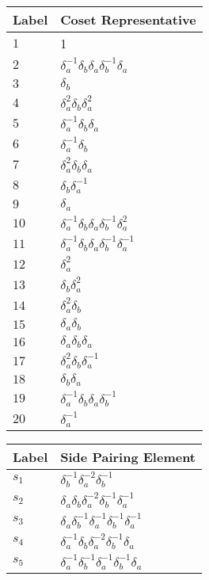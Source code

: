 \documentclass{article}
\begin{document}
\begin{center}
\begin{tabular}{ll}
\toprule
Label & Coset Representative\\
\midrule
$1$ & 1 \\
$2$ & $\delta_a^{-1}\delta_b^{}\delta_a^{}\delta_b^{-1}\delta_a^{}$ \\
$3$ & $\delta_b^{}$ \\
$4$ & $\delta_a^{2}\delta_b^{}\delta_a^{2}$ \\
$5$ & $\delta_a^{-1}\delta_b^{}\delta_a^{}$ \\
$6$ & $\delta_a^{-1}\delta_b^{}$ \\
$7$ & $\delta_a^{2}\delta_b^{}\delta_a^{}$ \\
$8$ & $\delta_b^{}\delta_a^{-1}$ \\
$9$ & $\delta_a^{}$ \\
$10$ & $\delta_a^{-1}\delta_b^{}\delta_a^{}\delta_b^{-1}\delta_a^{2}$ \\
$11$ & $\delta_a^{-1}\delta_b^{}\delta_a^{}\delta_b^{-1}\delta_a^{-1}$ \\
$12$ & $\delta_a^{2}$ \\
$13$ & $\delta_b^{}\delta_a^{2}$ \\
$14$ & $\delta_a^{2}\delta_b^{}$ \\
$15$ & $\delta_a^{}\delta_b^{}$ \\
$16$ & $\delta_a^{}\delta_b^{}\delta_a^{}$ \\
$17$ & $\delta_a^{2}\delta_b^{}\delta_a^{-1}$ \\
$18$ & $\delta_b^{}\delta_a^{}$ \\
$19$ & $\delta_a^{-1}\delta_b^{}\delta_a^{}\delta_b^{-1}$ \\
$20$ & $\delta_a^{-1}$ \\
\bottomrule
\end{tabular}
\hfill
\begin{tabular}{ll}
\toprule
Label & Side Pairing Element\\
\midrule
$s_{1}$ & $\delta_b^{-1}\delta_a^{-2}\delta_b^{-1}$ \\
$s_{2}$ & $\delta_a^{}\delta_b^{}\delta_a^{-2}\delta_b^{-1}\delta_a^{-1}$ \\
$s_{3}$ & $\delta_a^{}\delta_b^{-1}\delta_a^{-1}\delta_b^{-1}\delta_a^{-1}$ \\
$s_{4}$ & $\delta_a^{-1}\delta_b^{}\delta_a^{-2}\delta_b^{-1}\delta_a^{}$ \\
$s_{5}$ & $\delta_a^{-1}\delta_b^{-1}\delta_a^{-1}\delta_b^{-1}\delta_a^{}$ \\

\end{tabular}
\end{center}
\end{document}
